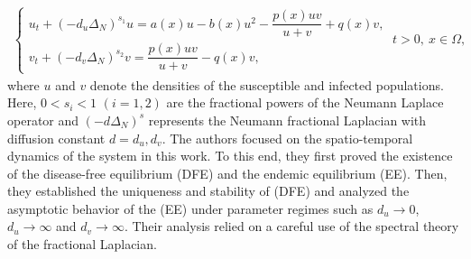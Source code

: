 \documentclass[a4paper,11pt]{amsart}
\theoremstyle{definition}
\def\O{\Omega}
\numberwithin{equation}{section}
\theoremstyle{definition}
\def\O{\Omega}
\begin{document}
\begin{align*}
\left\{\begin{array}{llll}
u_t + ( - d_u\Delta_N)^{s_1} u = a(x)u - b(x)u^2 - \dfrac{p(x) u v}{u+v} + q(x)v,\\[6pt]
v_t + ( - d_v\Delta_N)^{s_2} v = \dfrac{p(x) u v}{u+v} - q(x)v,
\end{array}\right.~t>0,~x\in \O,
\end{align*}
where $u$ and $v$ denote the densities of the susceptible and infected populations. Here, $0<s_i<1$ $(i=1,2)$ are the fractional powers of the Neumann Laplace operator and $(-d\Delta_N)^s$ represents the Neumann fractional Laplacian with diffusion constant $d=d_u,d_v$. The authors focused on the spatio-temporal dynamics of the system in this work. To this end, they first proved the existence of the disease-free equilibrium (DFE) and the endemic equilibrium (EE). Then, they established the uniqueness and stability of (DFE) and analyzed the asymptotic behavior of the (EE) under parameter regimes such as $d_u \to 0$, $d_u \to \infty$ and $d_v \to \infty$. Their analysis relied on a careful use of the spectral theory of the fractional Laplacian. 
\end{document}
